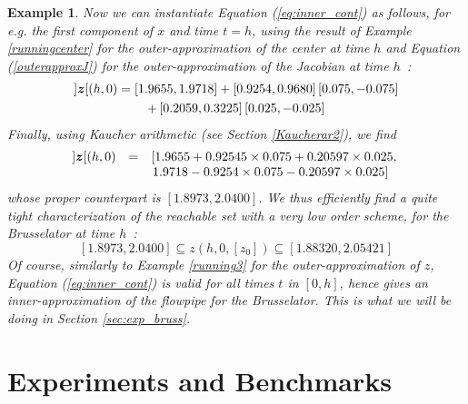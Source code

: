 \documentclass{sig-alternate-05-2015} %
\newcommand\ForAuthors[1]%
 {\par\smallskip                     %
  \begin{center}%
   \fbox%
   {\parbox{0.9\linewidth}%
    {\raggedright\sc--- #1}%
   }%
  \end{center}%
  \par\smallskip                     %
 }
\newtheorem{example}{Example}
\def\intvl#1{\mbox{$[ #1 ]$}}
\begin{document}
\begin{example}
Now we can instantiate Equation (\ref{eq:inner_cont}) as follows, for e.g. the first component of $x$ and
time $t=h$, using the result of Example \ref{runningcenter} for the outer-approximation of the center at time $h$ and
Equation (\ref{outerapproxJ}) for the outer-approximation of the Jacobian at time $h$~: 
\begin{multline}
]\z[(h,0) = \left[1.9655, 1.9718\right]+\left[0.9254, 0.9680\right]\left[0.075,-0.075\right]\\
+\left[0.2059, 0.3225\right]\left[0.025,-0.025\right]
\end{multline}
Finally, using Kaucher arithmetic (see Section \ref{Kaucherar2}), we find 
$$\begin{array}{rcl}
]\z[(h,0) & = &
\left[1.9655+0.92545\times0.075+0.20597\times0.025, \right. \\
& & \left. 1.9718-0.9254\times 0.075-0.20597\times 0.025\right]
\end{array}$$
\noindent whose proper counterpart is $\left[1.8973,2.0400\right]$.
We thus efficiently find a quite tight characterization of the reachable set with a very low order scheme, for
the Brusselator at time $h$~: 
$$\left[1.8973,2.0400\right]
\subseteq z(h,0,\intvl{z_0})\subseteq \left[1.88320, 2.05421\right]$$
Of course, similarly to Example \ref{running3} for the outer-approximation of $z$, Equation (\ref{eq:inner_cont})
is valid for all times $t$ in $[0,h]$, hence gives an inner-approximation of the flowpipe for the Brusselator. This is
what we will be doing in Section \ref{sec:exp_bruss}.  
\end{example}

\section{Experiments and Benchmarks}
\label{sec:experiments}

\end{document}
